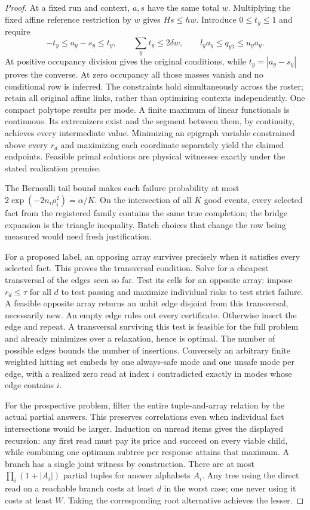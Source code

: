 \begin{proof}

At a fixed run and context, \(a,s\) have the same total \(w\). Multiplying the fixed affine reference restriction by \(w\) gives \(Hs\le hw\). Introduce \(0\le t_y\le1\) and require
\[
-t_y\le a_y-s_y\le t_y,\qquad \sum_y t_y\le2\delta w,\qquad
l_ya_y\le q_{y1}\le u_ya_y.
\]
At positive occupancy division gives the original conditions, while \(t_y=|a_y-s_y|\) proves the converse. At zero occupancy all those masses vanish and no conditional row is inferred. The constraints hold simultaneously across the roster; retain all original affine links, rather than optimizing contexts independently. One compact polytope results per mode. A finite maximum of linear functionals is continuous. Its extremizers exist and the segment between them, by continuity, achieves every intermediate value. Minimizing an epigraph variable constrained above every \(r_d\) and maximizing each coordinate separately yield the claimed endpoints. Feasible primal solutions are physical witnesses exactly under the stated realization premise.

The Bernoulli tail bound makes each failure probability at most \(2\exp(-2n_i\rho_i^2)=\alpha/K\). On the intersection of all \(K\) good events, every selected fact from the registered family contains the same true completion; the bridge expansion is the triangle inequality. Batch choices that change the row being measured would need fresh justification.

For a proposed label, an opposing array survives precisely when it satisfies every selected fact. This proves the transversal condition. Solve for a cheapest transversal of the edges seen so far. Test its cells for an opposite array: impose \(r_d\le\tau\) for all \(d\) to test passing and maximize individual risks to test strict failure. A feasible opposite array returns an unhit edge disjoint from this transversal, necessarily new. An empty edge rules out every certificate. Otherwise insert the edge and repeat. A transversal surviving this test is feasible for the full problem and already minimizes over a relaxation, hence is optimal. The number of possible edges bounds the number of insertions. Conversely an arbitrary finite weighted hitting set embeds by one always-safe mode and one unsafe mode per edge, with a realized zero read at index \(i\) contradicted exactly in modes whose edge contains \(i\).

For the prospective problem, filter the entire tuple-and-array relation by the actual partial answers. This preserves correlations even when individual fact intersections would be larger. Induction on unread items gives the displayed recursion: any first read must pay its price and succeed on every viable child, while combining one optimum subtree per response attains that maximum. A branch has a single joint witness by construction. There are at most \(\prod_i(1+|A_i|)\) partial tuples for answer alphabets \(A_i\). Any tree using the direct read on a reachable branch costs at least \(d\) in the worst case; one never using it costs at least \(W\). Taking the corresponding root alternative achieves the lesser.

\end{proof}

